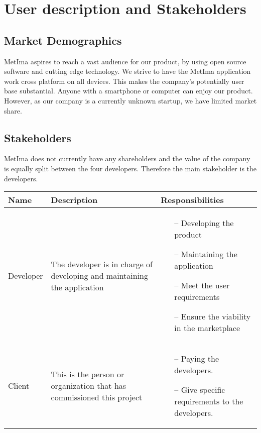 \documentclass{article}
\begin{document}
\section{User description and Stakeholders}
\subsection{Market Demographics}
MetIma aspires to reach a vast audience for our product, by using open source software and cutting edge technology. We strive to have the MetIma application work cross platform on all devices. This makes the company's potentially user base substantial. Anyone with a smartphone or computer can enjoy our product. However, as our company is a currently unknown startup, we have limited market share. 
\subsection{Stakeholders}
MetIma does not currently have any shareholders and the value of the company is equally split between the four developers. Therefore the main stakeholder is the developers. \vspace{0.2in} \newline 
\begin{tabularx}{1.0\textwidth} { 
  | >{\raggedright\arraybackslash}X 
  | >{\raggedright\arraybackslash}X
  | >{\raggedright\arraybackslash}X | }
    \hline
    \rowcolor{lightgray} Name & Description & Responsibilities \\
    \hline
    Developer & The developer is in charge of developing and maintaining the application &
    \begin{itemize}
        \item[--] Developing the product
        \item[--] Maintaining the application 
        \item[--] Meet the user requirements
        \item[--] Ensure the viability in the marketplace
    \end{itemize}{} \\
    \hline
     Client & This is the person or organization that has commissioned this project &
    \begin{itemize}
        \item[--]  Paying the developers.
        \item[--]  Give specific requirements to the developers.
    \end{itemize}{} \\
    \hline
    
\end{tabularx}
\end{document}
